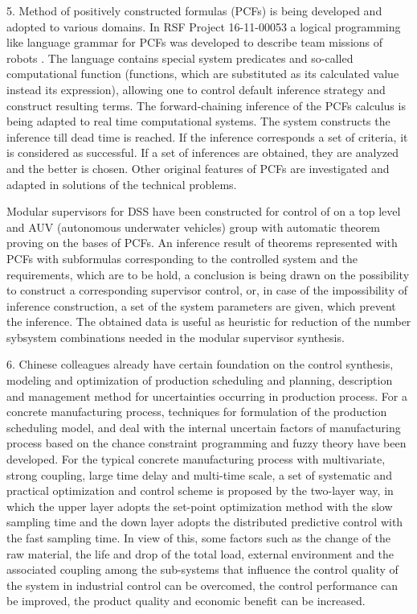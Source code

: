 \documentclass[runningheads]{llncs}
\begin{document}
    5. Method of positively constructed formulas (PCFs) is being developed and adopted to various domains. In RSF Project 16-11-00053 a logical programming like language grammar for PCFs was developed to describe team missions of robots \cite{b5}. The language contains special system predicates and so-called computational function (functions, which are substituted as its calculated value instead its expression), allowing one to control default inference strategy and construct resulting terms. The forward-chaining inference of the PCFs calculus is being adapted to real time computational systems. The system constructs the inference till dead time is reached. If the inference corresponds a set of criteria, it is considered as successful. If a set of inferences are obtained, they are analyzed and the better is chosen. Other original features of PCFs are investigated and adapted in solutions of the technical problems.

Modular supervisors for DSS have been constructed for control of on a top level and AUV (autonomous underwater vehicles) group with automatic theorem proving on the bases of PCFs. An inference result of theorems represented with PCFs with subformulas corresponding to the controlled system and the requirements, which are to be hold, a conclusion is being drawn on the possibility to construct a corresponding supervisor control, or, in case of the impossibility of inference construction, a set of the system parameters are given, which prevent the inference. The obtained data is useful as heuristic for reduction of the number sybsystem combinations needed in the modular supervisor synthesis.

6. Chinese colleagues already have certain foundation on the control synthesis, modeling and optimization of production scheduling and planning, description and management method for uncertainties occurring in production process. For a concrete manufacturing process, techniques for formulation of the production scheduling model, and deal with the internal uncertain factors of manufacturing process based on the chance constraint programming and fuzzy theory \cite{b6} have been developed. For the typical concrete manufacturing process with multivariate, strong coupling, large time delay and multi-time scale, a set of systematic and practical optimization and control scheme is proposed by the two-layer way, in which the upper layer adopts the set-point optimization method with the slow sampling time and the down layer adopts the distributed predictive control with the fast sampling time. In view of this, some factors such as the change of the raw material, the life and drop of the total load, external environment and the associated coupling among the sub-systems that influence the control quality of the system in industrial control can be overcomed, the control performance can be improved, the product quality and economic benefit can be increased.
\end{document}
